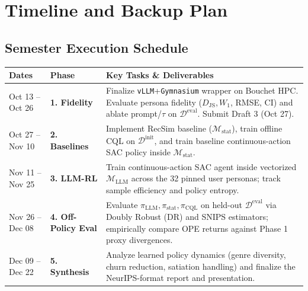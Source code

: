 \documentclass{article}
\begin{document}
\section{Timeline and Backup Plan}

\subsection{Semester Execution Schedule}
\begin{table}[h]
\centering
\label{tab:timeline}
\small
\begin{tabular}{@{}llp{9.3cm}@{}}
\toprule
\textbf{Dates} & \textbf{Phase} & \textbf{Key Tasks \& Deliverables} \\ \midrule
Oct 13 -- Oct 26 & \textbf{1. Fidelity} & Finalize \texttt{vLLM}+\texttt{Gymnasium} wrapper on Bouchet HPC. Evaluate persona fidelity ($D_{\text{JS}}, W_1$, RMSE, $\text{CI}$) and ablate prompt/$\tau$ on $\mathcal{D}^{\text{eval}}$. Submit Draft 3 (Oct 27). \\ \addlinespace[1pt]
Oct 27 -- Nov 10 & \textbf{2. Baselines} & Implement RecSim baseline ($\mathcal{M}_{\text{stat}}$), train offline CQL on $\mathcal{D}^{\text{init}}$, and train baseline continuous-action SAC policy inside $\mathcal{M}_{\text{stat}}$. \\ \addlinespace[1pt]
Nov 11 -- Nov 25 & \textbf{3. LLM-RL} & Train continuous-action SAC agent inside vectorized $\mathcal{M}_{\text{LLM}}$ across the 32 pinned user personas; track sample efficiency and policy entropy. \\ \addlinespace[1pt]
Nov 26 -- Dec 08 & \textbf{4. Off-Policy Eval} & Evaluate $\pi_{\text{LLM}}, \pi_{\text{stat}}, \pi_{\text{CQL}}$ on held-out $\mathcal{D}^{\text{eval}}$ via Doubly Robust (DR) and SNIPS estimators; empirically compare OPE returns against Phase 1 proxy divergences. \\ \addlinespace[1pt]
Dec 09 -- Dec 22 & \textbf{5. Synthesis} & Analyze learned policy dynamics (genre diversity, churn reduction, satiation handling) and finalize the NeurIPS-format report and presentation. \\ \bottomrule
\end{tabular}
\end{table}
\end{document}
